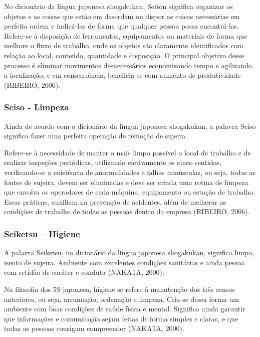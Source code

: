 \documentclass[
]{article}
\begin{document}
No dicionário da língua japonesa shogakukan, Seiton significa organizar os objetos e as coisas que estão em desordem ou dispor as coisas necessárias em perfeita ordem e indicá-las de forma que qualquer pessoa possa encontrá-las. Refere-se à disposição de ferramentas, equipamentos ou materiais de forma que melhore o fluxo de trabalho, onde os objetos são claramente identificados com relação ao local, conteúdo, quantidade e disposição.
O principal objetivo desse processo é eliminar movimentos desnecessários economizando tempo e agilizando a localização, e em consequência, beneficia-se com aumento de produtividade (RIBEIRO, 2006).

\hypertarget{seiso---limpeza}{%
\subsubsection{Seiso - Limpeza}\label{seiso---limpeza}}

Ainda de acordo com o dicionário da língua japonesa shogakukan, a palavra Seiso significa fazer uma perfeita operação de remoção de sujeira.

Refere-se à necessidade de manter o mais limpo possível o local de trabalho e de realizar inspeções periódicas, utilizando efetivamente os cinco sentidos, verificando-se a existência de anormalidades e falhas minúsculas, ou seja, todas as fontes de sujeira, devem ser eliminadas e deve ser criada uma rotina de limpeza que envolva os operadores de cada máquina, equipamento ou estação de trabalho. Essas práticas, auxiliam na prevenção de acidentes, além de melhorar as condições de trabalho de todas as pessoas dentro da empresa (RIBEIRO, 2006).

\hypertarget{seiketsu-higiene}{%
\subsubsection{Seiketsu -- Higiene}\label{seiketsu-higiene}}

A palavra Seiketsu, no dicionário da língua japonesa shogakukan, significa limpo, isento de sujeira. Ambiente com excelentes condições sanitárias e ainda pessoa com retidão de caráter e conduta (NAKATA, 2000).

Na filosofia dos 5S japonesa, higiene se refere à manutenção dos três sensos anteriores, ou seja, arrumação, ordenação e limpeza. Cria-se dessa forma um ambiente com boas condições de saúde física e mental. Significa ainda garantir que informações e comunicação sejam feitas de forma simples e claras, e que todas as pessoas consigam compreender (NAKATA, 2000).
\end{document}
